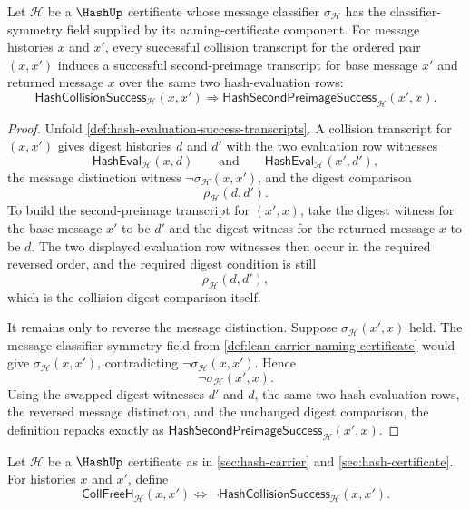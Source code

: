\begin{theorem}
\label{thm:hash-collision-success-induces-reversed-second-preimage}
Let $\mathcal H$ be a $\HashUp$ certificate whose message classifier $\sigma_{\mathcal H}$ has the classifier-symmetry field supplied by its naming-certificate component. For message histories $x$ and $x'$, every successful collision transcript for the ordered pair $(x,x')$ induces a successful second-preimage transcript for base message $x'$ and returned message $x$ over the same two hash-evaluation rows:
$$
\mathsf{HashCollisionSuccess}_{\mathcal H}(x,x')
\Longrightarrow
\mathsf{HashSecondPreimageSuccess}_{\mathcal H}(x',x).
$$
\end{theorem}
\begin{proof}
Unfold \autoref{def:hash-evaluation-success-transcripts}. A collision transcript for $(x,x')$ gives digest histories $d$ and $d'$ with the two evaluation row witnesses
$$
\mathsf{HashEval}_{\mathcal H}(x,d)
\qquad\text{and}\qquad
\mathsf{HashEval}_{\mathcal H}(x',d'),
$$
the message distinction witness $\neg\sigma_{\mathcal H}(x,x')$, and the digest comparison
$$
\rho_{\mathcal H}(d,d').
$$
To build the second-preimage transcript for $(x',x)$, take the digest witness for the base message $x'$ to be $d'$ and the digest witness for the returned message $x$ to be $d$. The two displayed evaluation row witnesses then occur in the required reversed order, and the required digest condition is still
$$
\rho_{\mathcal H}(d,d'),
$$
which is the collision digest comparison itself.

It remains only to reverse the message distinction. Suppose $\sigma_{\mathcal H}(x',x)$ held. The message-classifier symmetry field from \autoref{def:lean-carrier-naming-certificate} would give $\sigma_{\mathcal H}(x,x')$, contradicting $\neg\sigma_{\mathcal H}(x,x')$. Hence
$$
\neg\sigma_{\mathcal H}(x',x).
$$
Using the swapped digest witnesses $d'$ and $d$, the same two hash-evaluation rows, the reversed message distinction, and the unchanged digest comparison, the definition repacks exactly as $\mathsf{HashSecondPreimageSuccess}_{\mathcal H}(x',x)$.
\end{proof}

\begin{definition}
\label{def:hash-collision-freeness}
Let $\mathcal H$ be a $\HashUp$ certificate as in \autoref{sec:hash-carrier} and \autoref{sec:hash-certificate}. For histories $x$ and $x'$, define
$$
\mathsf{CollFreeH}_{\mathcal H}(x,x')
\Longleftrightarrow
\neg\mathsf{HashCollisionSuccess}_{\mathcal H}(x,x').
$$
\end{definition}

